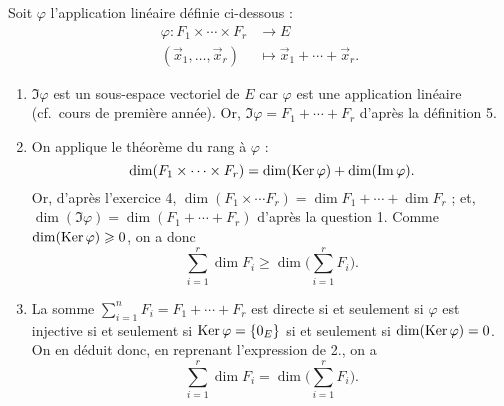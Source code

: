 \begin{prv}
	Soit $\varphi$\/ l'application linéaire définie ci-dessous : 
	\begin{align*}
		\varphi: F_1 \times \cdots \times  F_r &\longrightarrow E \\
		(\vec{x}_1, \ldots, \vec{x}_r) &\longmapsto \vec{x}_1 + \cdots + \vec{x}_r.
	\end{align*}
	\begin{enumerate}
		\item $\Im \varphi$\/ est un sous-espace vectoriel de $E$\/ car $\varphi$\/ est une application linéaire (cf.\ cours de première année). Or, $\Im \varphi = F_1 + \cdots + F_r$ d'après la {\sc définition}\/ 5.
		\item On applique le théorème du rang à $\varphi$\/ : \[
				\dim(F_1\times \cdots \times F_r) = \dim(\operatorname{Ker} \varphi) + \dim(\operatorname{Im} \varphi)
			.\] Or, d'après l'{\sc exercice}\/ 4, $\dim(F_1 \times \cdots F_r) = \dim F_1 + \cdots + \dim F_r$\/ ; et, $\dim(\Im \varphi) = \dim(F_1 + \cdots + F_r)$\/ d'après la question 1.
			Comme $\dim(\operatorname{Ker} \varphi) \geqslant 0$, on a donc \[
				\sum_{i=1}^r \dim F_i \ge \dim\Big(\sum_{i=1}^r F_i\Big)
			.\]
		\item La somme $\sum_{i=1}^n F_i = F_1 + \cdots + F_r$\/ est directe si et seulement si $\varphi$\/ est injective si et seulement si $\operatorname{Ker} \varphi = \{0_E\}$\/ si et seulement si $\dim(\operatorname{Ker} \varphi) = 0$. On en déduit donc, en reprenant l'expression de 2., on a \[
				\sum_{i=1}^r \dim F_i = \dim \Big(\sum_{i=1}^r F_i\Big)
			.\]
	\end{enumerate}
\end{prv}

